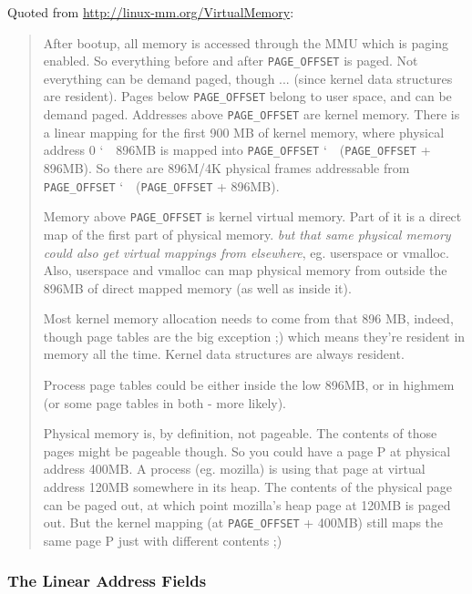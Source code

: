 Quoted from \url{http://linux-mm.org/VirtualMemory}:
\begin{quote}
  After bootup, all memory is accessed through the MMU which is paging enabled. So
  everything before and after \texttt{PAGE\_OFFSET} is paged. Not everything can be demand
  paged, though ... (since kernel data structures are resident). Pages below
  \texttt{PAGE\_OFFSET} belong to user space, and can be demand paged. Addresses above
  \texttt{PAGE\_OFFSET} are kernel memory. There is a linear mapping for the first 900 MB
  of kernel memory, where physical address 0 \char`~\, 896MB is mapped into
  \texttt{PAGE\_OFFSET} \char`~\, (\texttt{PAGE\_OFFSET} + 896MB). So there are 896M/4K
  physical frames addressable from \texttt{PAGE\_OFFSET} \char`~\, (\texttt{PAGE\_OFFSET} +
  896MB).

  Memory above \texttt{PAGE\_OFFSET} is kernel virtual memory. Part of it is a direct map of
  the first part of physical memory. \emph{but that same physical memory could also get
    virtual mappings from elsewhere}, eg. userspace or vmalloc. Also, userspace and
  vmalloc can map physical memory from outside the 896MB of direct mapped memory (as well
  as inside it).

  Most kernel memory allocation needs to come from that 896 MB, indeed, though page tables
  are the big exception ;) which means they're resident in memory all the time. Kernel
  data structures are always resident.

  Process page tables could be either inside the low 896MB, or in highmem (or some page
  tables in both - more likely).

  Physical memory is, by definition, not pageable. The contents of those pages might be
  pageable though. So you could have a page P at physical address 400MB. A process
  (eg. mozilla) is using that page at virtual address 120MB somewhere in its heap. The
  contents of the physical page can be paged out, at which point mozilla's heap page at
  120MB is paged out. But the kernel mapping (at \texttt{PAGE\_OFFSET} + 400MB) still maps
  the same page P just with different contents ;)
\end{quote}

\subsubsection{The Linear Address Fields}
    

